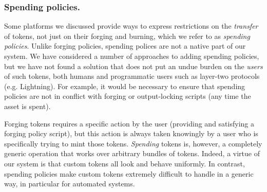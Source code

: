 




\subsubsection{Spending policies.}

Some platforms we discussed provide ways to express restrictions on the \emph{transfer} of
tokens, not just on their forging and burning, which we refer to as \textit{spending policies}.
Unlike forging policies, spending polices are not a native part of our system.
We have considered a number of approaches to adding spending policies, but we
have not found a solution that does not put an undue burden on the \emph{users}
of such tokens, both humans and programmatic users such as layer-two protocols
(e.g. Lightning). For example, it would be necessary to ensure that spending
policies are not in conflict with forging or output-locking scripts (any time the asset is spent).

Forging tokens requires a specific action by the user (providing and satisfying a forging policy script), but this action is always taken knowingly by a user who is specifically trying to mint those tokens.
\emph{Spending} tokens is, however, a completely generic operation that works over arbitrary bundles of tokens.
Indeed, a virtue of our system is that custom tokens all look and behave uniformly.
In contrast, spending policies make custom tokens extremely difficult to handle in a generic way, in particular for automated systems.

